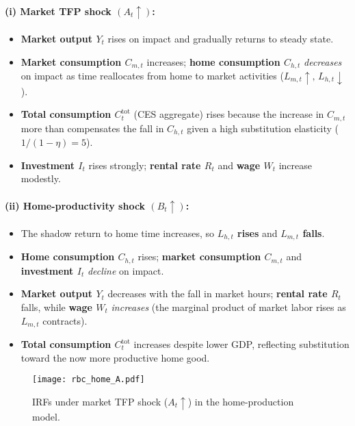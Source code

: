 \documentclass[a4paper,12pt]{article}
\theoremstyle{nonitalic}
\begin{document}
\paragraph{(i) Market TFP shock $(A_t\uparrow)$:} 
\begin{itemize}
  \item \textbf{Market output $Y_t$} rises on impact and gradually returns to steady state.
  \item \textbf{Market consumption $C_{m,t}$} increases; \textbf{home consumption $C_{h,t}$} \emph{decreases} on impact as time reallocates from home to market activities (\(L_{m,t}\uparrow,\,L_{h,t}\downarrow\)).
  \item \textbf{Total consumption $C^{\text{tot}}_t$} (CES aggregate) rises because the increase in $C_{m,t}$ more than compensates the fall in $C_{h,t}$ given a high substitution elasticity ($1/(1-\eta)=5$).
  \item \textbf{Investment $I_t$} rises strongly; \textbf{rental rate $R_t$} and \textbf{wage $W_t$} increase modestly.
\end{itemize}

\paragraph{(ii) Home-productivity shock $(B_t\uparrow)$:}
\begin{itemize}
  \item The shadow return to home time increases, so \textbf{$L_{h,t}$ rises} and \textbf{$L_{m,t}$ falls}. 
  \item \textbf{Home consumption $C_{h,t}$} rises; \textbf{market consumption $C_{m,t}$} and \textbf{investment $I_t$} \emph{decline} on impact.
  \item \textbf{Market output $Y_t$} decreases with the fall in market hours; \textbf{rental rate $R_t$} falls, while \textbf{wage $W_t$} \emph{increases} (the marginal product of market labor rises as $L_{m,t}$ contracts).
  \item \textbf{Total consumption $C^{\text{tot}}_t$} increases despite lower GDP, reflecting substitution toward the now more productive home good.
\end{itemize}

\begin{figure}[H]
  \centering
  \texttt{[image: rbc\_home\_A.pdf]}
  \caption{IRFs under market TFP shock ($A_t\uparrow$) in the home-production model.}
  \label{fig:rbc_home_A_irf}
\end{figure}
\end{document}
